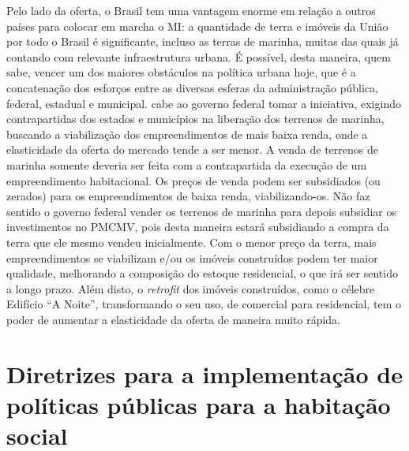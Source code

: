\documentclass[
	12pt,				%
	oneside,			%
	a4paper,			%
	chapter=TITLE,		%
	section=TITLE,		%
	english,			%
	brazil				%
	]{abntex2}
\begin{document}
\begin{refsection}
Pelo lado da oferta, o Brasil tem uma vantagem enorme em relação a outros países
para colocar em marcha o \gls{MI}: a quantidade de terra e imóveis da União por
todo o Brasil é significante, incluso as terras de marinha, muitas das quais já
contando com relevante infraestrutura urbana. É possível, desta maneira, quem
sabe, vencer um dos maiores obstáculos na política urbana hoje, que é a
concatenação dos esforços entre as diversas esferas da administração pública,
federal, estadual e municipal. cabe ao governo federal tomar a iniciativa,
exigindo contrapartidas dos estados e municípios na liberação dos terrenos de
marinha, buscando a viabilização dos empreendimentos de mais baixa renda, onde
a elasticidade da oferta do mercado tende a ser menor. A venda de terrenos de
marinha somente deveria ser feita com a contrapartida da execução de um
empreendimento habitacional. Os preços de venda podem ser subsidiados (ou
zerados) para os empreendimentos de baixa renda, viabilizando-os. Não faz sentido
o governo federal vender os terrenos de marinha para depois subsidiar os
investimentos no \gls{PMCMV}, pois desta maneira estará subsidiando a compra da
terra que ele mesmo vendeu inicialmente. Com o menor preço da terra, mais
empreendimentos se viabilizam e/ou os imóveis construídos podem ter maior
qualidade, melhorando a composição do estoque residencial, o que irá ser sentido
a longo prazo. Além disto, o \emph{retrofit} dos imóveis construídos, como o célebre
Edifício ``A Noite'', transformando o seu uso, de comercial para residencial,
tem o poder de aumentar a elasticidade da oferta de maneira muito rápida.

\hypertarget{diretrizes-para-a-implementauxe7uxe3o-de-poluxedticas-puxfablicas-para-a-habitauxe7uxe3o-social}{%
\section{Diretrizes para a implementação de políticas públicas para a habitação social}\label{diretrizes-para-a-implementauxe7uxe3o-de-poluxedticas-puxfablicas-para-a-habitauxe7uxe3o-social}}


\end{refsection}
\end{document}
